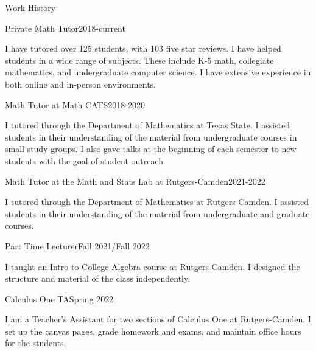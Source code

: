 \documentclass{resume} %
\begin{document}
\begin{rSection}{Work History}

\begin{rSubsection}{Private Math Tutor}{}{2018-current}{}
\item I have tutored over 125 students, with 103 five star reviews.
I have helped students in a wide range of subjects.
These include K-5 math, collegiate mathematics, and undergraduate computer science.
I have extensive experience in both online and in-person environments.

 
\end{rSubsection} 



\begin{rSubsection}{Math Tutor at Math CATS}{}{2018-2020}{}
\item I tutored through the Department of Mathematics at Texas State. I assisted students in their understanding of the material from undergraduate courses in small study groups. I also gave talks at the beginning of each semester to new students with the goal of student outreach.

\end{rSubsection}


\begin{rSubsection}{Math Tutor at the Math and Stats Lab at Rutgers-Camden}{}{2021-2022}{}
\item I tutored through the Department of Mathematics at Rutgers-Camden. I assisted students in their understanding of the material from undergraduate and graduate courses.

\end{rSubsection}


\begin{rSubsection}{Part Time Lecturer}{}{Fall 2021/Fall 2022}{}
\item I taught an Intro to College Algebra course at Rutgers-Camden. I designed the structure and material of the class independently.

\end{rSubsection}

\newpage

\begin{rSubsection}{Calculus One TA}{}{Spring 2022}{}
\item I am a Teacher's Assistant for two sections of Calculus One at Rutgers-Camden. I set up the canvas pages, grade homework and exams, and maintain office hours for the students.


\end{rSubsection}
\end{rSection}
\end{document}

